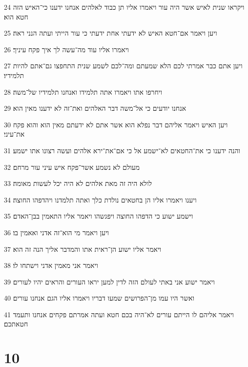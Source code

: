 \par 24 ויקראו שנית לאיש אשר היה עור ויאמרו אליו תן כבוד לאלהים אנחנו ידענו כי־האיש הזה חטא הוא׃
\par 25 ויען ויאמר אם־חטא האיש לא ידעתי אחת ידעתי כי עור הייתי ועתה הנני ראה׃
\par 26 ויאמרו אליו עוד מה־עשה לך איך פקח עיניך׃
\par 27 ויען אתם כבר אמרתי לכם הלא שמעתם ומה־לכם לשמע שנית התחפצו גם־אתם להיות תלמידיו׃
\par 28 ויחרפו אתו ויאמרו אתה תלמידו ואנחנו תלמידיו של־משה׃
\par 29 אנחנו יודעים כי אל־משה דבר האלהים ואת־זה לא ידענו מאין הוא׃
\par 30 ויען האיש ויאמר אליהם דבר נפלא הוא אשר אתם לא ידעתם מאין הוא והוא פקח את־עיני׃
\par 31 והנה ידענו כי את־החטאים לא־ישמע אל כי אם־את־ירא אלהים ועשה רצונו אתו ישמע׃
\par 32 מעולם לא נשמע אשר־פקח איש עיני עור מרחם׃
\par 33 לולא היה זה מאת אלהים לא היה יכל לעשות מאומה׃
\par 34 ויענו ויאמרו אליו הן בחטאים נולדת כלך ואתה תלמדנו ויהדפהו החוצה׃
\par 35 וישמע ישוע כי הדפהו החוצה ויפגשהו ויאמר אליו התאמין בבן־האדם׃
\par 36 ויען ויאמר מי הוא־זה אדני ואאמין בו׃
\par 37 ויאמר אליו ישוע הן־ראית אתו והמדבר אליך הנה זה הוא׃
\par 38 ויאמר אני מאמין אדני וישתחו לו׃
\par 39 ויאמר ישוע אני באתי לעולם הזה לדין למען יראו העורים והראים יהיו לעורים׃
\par 40 ואשר היו עמו מן־הפרושים שמעו דבריו ויאמרו אליו הגם אנחנו עורים׃
\par 41 ויאמר אליהם לו הייתם עורים לא־היה בכם חטא ועתה אמרתם פקחים אנחנו ותעמד חטאתכם׃

\chapter{10}

